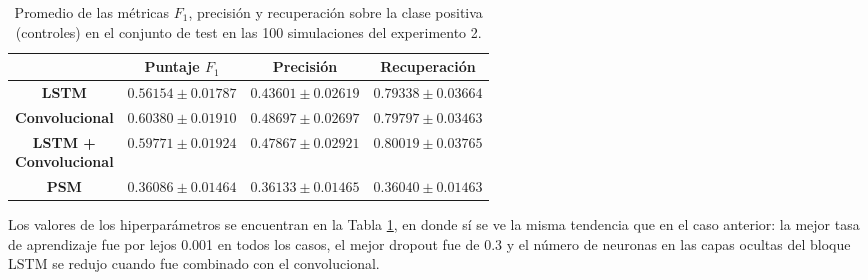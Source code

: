\documentclass[../../main.tex]{subfiles}
\begin{document}
\begin{table}[H]
    \centering
    \renewcommand{\arraystretch}{1.2}
    \begin{tabular}{|c|c|c|c|}
        \hline
         & \textbf{Puntaje} \(F_1\) & \textbf{Precisión} & \textbf{Recuperación} \\ \hline\hline
        \textbf{LSTM}
            & $0.56154 \pm 0.01787$ & $0.43601 \pm 0.02619$ & $0.79338 \pm 0.03664$ \\ \hline
        \textbf{Convolucional}
            & $\mathbf{0.60380 \pm 0.01910}$ & $\mathbf{0.48697 \pm 0.02697}$ & $0.79797 \pm 0.03463$ \\ \hline
        \makecell{\textbf{LSTM +} \\ \textbf{Convolucional}}
            & $0.59771 \pm 0.01924$ & $0.47867 \pm 0.02921$ & $\mathbf{0.80019 \pm 0.03765}$ \\ \hline
        \textbf{PSM}
            & $0.36086 \pm 0.01464$ & $0.36133 \pm 0.01465$ & $0.36040 \pm 0.01463$ \\
        \hline
    \end{tabular}
    \caption{Promedio de las métricas \(F_1\), precisión y recuperación sobre la
    clase positiva (controles) en el conjunto de test en las 100 simulaciones del
    experimento 2.}
    \label{tab:results_exp2}
\end{table}

Los valores de los hiperparámetros se encuentran en la Tabla \ref{tab:results_exp2}, en
donde sí se ve la misma tendencia que en el caso anterior: la mejor tasa de aprendizaje
fue por lejos 0.001 en todos los casos, el mejor dropout fue de 0.3 y el número de
neuronas en las capas ocultas del bloque LSTM se redujo cuando fue combinado con el
convolucional.
\end{document}
